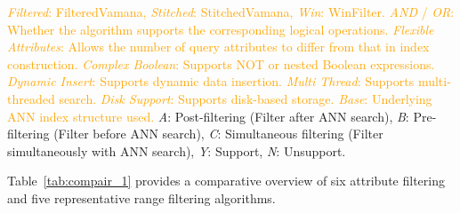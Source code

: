 \documentclass[sigconf, nonacm]{acmart}
\begin{document}
{\begin{table}[t]
		
		\centering
		\footnotesize{
			\begin{minipage}{\linewidth}
				\vspace{0.1cm}
		\textcolor{orange}{
		\textit{Filtered}: FilteredVamana, \textit{Stitched}: StitchedVamana, \textit{Win}: WinFilter.
		\textit{AND} / \textit{OR}: Whether the algorithm supports the corresponding logical operations.
		\textit{Flexible Attributes}: Allows the number of query attributes to differ from that in index construction.
		\textit{Complex Boolean}: Supports NOT or nested Boolean expressions.
		\textit{Dynamic Insert}: Supports dynamic data insertion.
		\textit{Multi Thread}: Supports multi-threaded search.
		\textit{Disk Support}: Supports disk-based storage.
		\textit{Base}: Underlying ANN index structure used.}
		\textit{A}: Post-filtering (Filter after ANN search), 
		\textit{B}: Pre-filtering (Filter before ANN search), 
		\textit{C}: Simultaneous filtering (Filter simultaneously with ANN search), 
		\textit{Y}: Support, 
		\textit{N}: Unsupport. 
		\end{minipage}}
		
	\end{table}
	
	
	Table~\ref{tab:compair_1} provides a comparative overview of six attribute filtering and five representative range filtering algorithms. 
	
}
\end{document}
